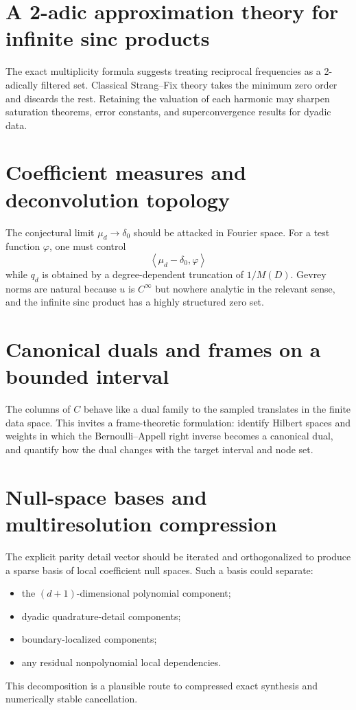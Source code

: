 \documentclass[11pt,oneside]{book}
\theoremstyle{definition}
\theoremstyle{remark}
\newcommand{\angles}[1]{\left\langle#1\right\rangle}
\begin{document}
\section{A 2-adic approximation theory for infinite sinc products}
The exact multiplicity formula suggests treating reciprocal frequencies as a 2-adically filtered set.  Classical Strang--Fix theory takes the minimum zero order and discards the rest.  Retaining the valuation of each harmonic may sharpen saturation theorems, error constants, and superconvergence results for dyadic data.

\section{Coefficient measures and deconvolution topology}
The conjectural limit \(\mu_d\to\delta_0\) should be attacked in Fourier space.  For a test function \(\varphi\), one must control
\[
 \angles{\mu_d-\delta_0,\varphi}
\]
while \(q_d\) is obtained by a degree-dependent truncation of \(1/M(D)\).  Gevrey norms are natural because \(u\) is \(C^\infty\) but nowhere analytic in the relevant sense, and the infinite sinc product has a highly structured zero set.

\section{Canonical duals and frames on a bounded interval}
The columns of \(C\) behave like a dual family to the sampled translates in the finite data space.  This invites a frame-theoretic formulation: identify Hilbert spaces and weights in which the Bernoulli--Appell right inverse becomes a canonical dual, and quantify how the dual changes with the target interval and node set.

\section{Null-space bases and multiresolution compression}
The explicit parity detail vector should be iterated and orthogonalized to produce a sparse basis of local coefficient null spaces.  Such a basis could separate:
\begin{itemize}
\item the \((d+1)\)-dimensional polynomial component;
\item dyadic quadrature-detail components;
\item boundary-localized components;
\item any residual nonpolynomial local dependencies.
\end{itemize}
This decomposition is a plausible route to compressed exact synthesis and numerically stable cancellation.
\end{document}
